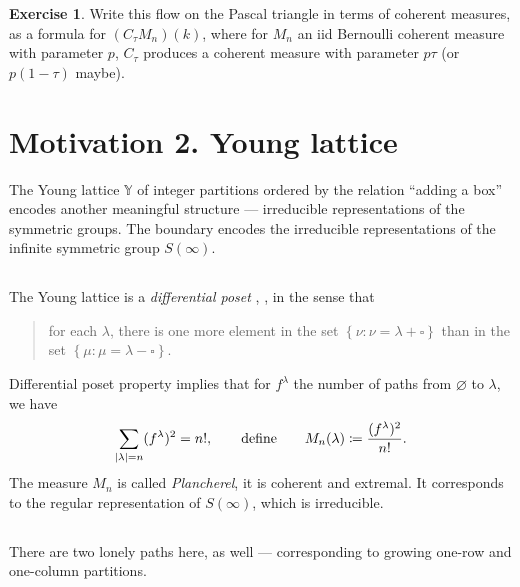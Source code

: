 \documentclass[letterpaper,11pt,oneside,reqno]{article}
\numberwithin{equation}{section}
\theoremstyle{definition}
\newtheorem{exercise}[proposition]{Exercise}
\begin{document}
\begin{exercise}
	Write this flow on the Pascal triangle in terms of coherent measures, as a formula for 
	$(C_\tau M_n)(k)$, where for $M_n$ an iid Bernoulli coherent measure with parameter $p$, $C_\tau$ produces
	a coherent measure with parameter $p \tau$ (or $p(1-\tau)$ maybe).
\end{exercise}


\section{Motivation 2. Young lattice}

The Young lattice $\mathbb{Y}$ of integer partitions ordered
by the relation ``adding a box''
encodes another meaningful structure --- irreducible representations of the symmetric groups.
The boundary encodes the irreducible representations of the infinite symmetric group $S(\infty)$.

\subsection{}
The Young lattice is a \emph{differential poset} \cite{stanley1988differential},
\cite{fomin1994duality},
in the sense that
\begin{quote}
	for each $\lambda$, there is one more element in the set
	$\left\{ \nu\colon\nu=\lambda+\square \right\}$ than
	in the set $\left\{ \mu\colon\mu=\lambda-\square \right\}$.
\end{quote}
Differential poset
property implies that
for $f^\lambda$ the number of paths from $\varnothing$ to $\lambda$, we have
\begin{equation*}
	\sum_{|\lambda|=n}(f^\lambda)^2=n!, \qquad \textnormal{define}\qquad
	M_n(\lambda)\coloneqq\frac{(f^\lambda)^2}{n!}.
\end{equation*}
The measure $M_n$ is called \emph{Plancherel}, it is coherent
and extremal. It corresponds to the regular representation of $S(\infty)$,
which is irreducible.

\subsection{}

There are two lonely paths here, as well --- corresponding to growing
one-row and one-column partitions.

\subsection{}
\end{document}
